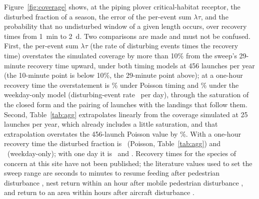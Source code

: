 \documentclass[11pt]{article}
\begin{document}
Figure~\ref{fig:coverage} shows, at the piping plover critical-habitat receptor, the disturbed fraction of a season, the error of the per-event sum $\lambda\tau$, and the probability that no undisturbed window of a given length occurs, over recovery times from 1~min to 2~d. Two comparisons are made and must not be confused. First, the per-event sum $\lambda\tau$ (the rate of disturbing events times the recovery time) overstates the simulated coverage by more than 10\% from the sweep's 29-minute recovery time upward, under both timing models at 456 launches per year (the 10-minute point is below 10\%, the 29-minute point above); at a one-hour recovery time the overstatement is \valEFivePoissonOverTauOneHPct\% under Poisson timing and \valEFiveWeekdayOverTauOneHPct\% under the weekday-only model (disturbing-event rate \valEFiveWeekdayRatePerDayNFourFiveSix~per day), through the saturation of the closed form and the pairing of launches with the landings that follow them. Second, Table~\ref{tab:agg} extrapolates linearly from the coverage simulated at 25 launches per year, which already includes a little saturation, and that extrapolation overstates the 456-launch Poisson value by \valEOneRelerrPctDisturbedPipingPloverCriticalHabitatNearPadOneDp\%. With a one-hour recovery time the disturbed fraction is \valEOneNFourFiveSixDisturbedHabitat~(Poisson, Table~\ref{tab:agg}) and \valEFiveWeekdayDisturbedTauOneH~(weekday-only); with one day it is \valEFivePoissonDisturbedTauTwoFourH~and \valEFiveWeekdayDisturbedTauTwoFourH. Recovery times for the species of concern at this site have not been published; the literature values used to set the sweep range are seconds to minutes to resume feeding after pedestrian disturbance \citep{collop2016}, nest return within an hour after mobile pedestrian disturbance \citep{weston2011}, and return to an area within hours after aircraft disturbance \citep{vanderkolk2020}.
\end{document}
